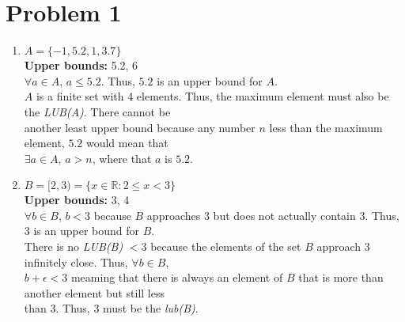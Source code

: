 \documentclass{article}
\begin{document}

\section*{Problem 1}
\begin{flushleft}
\begin{enumerate}
\item $A = \{-1, 5.2,1,3.7\}$ \\
\vspace{.3cm}
\qquad \textbf{Upper bounds:} 5.2, 6\\
\vspace{.3cm}
\qquad $\forall a \in A$, $a \leq 5.2$. Thus, $5.2$ is an upper bound for $A$. \\
\vspace{.3cm}
\qquad $A$ is a finite set with 4 elements. Thus, the maximum element must also be the \emph{LUB(A)}. There cannot be \\
\qquad another least upper bound because any number $n$ less than the maximum element, $5.2$ would mean that \\
\qquad $\exists a \in A$, $a > n$, where that $a$ is $5.2$. 
\vspace{.3cm}

\item $B = [2,3) = \{x \in \mathbb{R} : 2 \leq x < 3\}$\\
\vspace{.3cm}
\qquad \textbf{Upper bounds:} 3, 4\\
\vspace{.3cm}
\qquad $\forall b \in B$, $b < 3$ because $B$ approaches $3$ but does not actually contain $3$. Thus, 3 is an upper bound for $B$. \\
\vspace{.3cm}
\qquad There is no \emph{LUB(B)} $ < 3$ because the elements of the set $B$ approach $3$ infinitely close. Thus, $\forall b \in B$, \\
\qquad $b + \epsilon < 3$  meaming that there is always an element of $B$ that is more than another element but still less \\
\qquad  than $3$. Thus, $3$ must be the \emph{lub(B)}. 
\vspace{.3cm}


\end{enumerate}
\end{flushleft}
\end{document}
